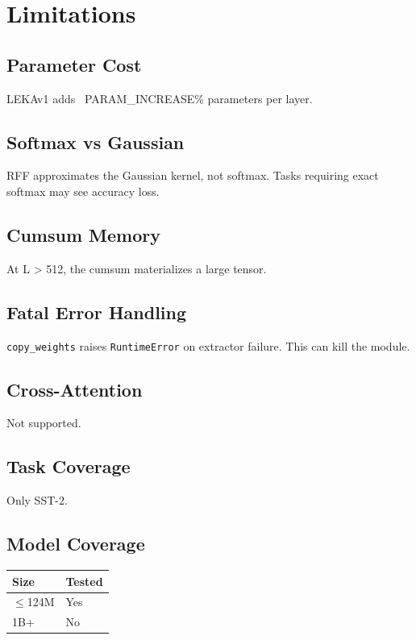 \section{Limitations}

\subsection{Parameter Cost}

LEKAv1 adds ~{{PARAM\_INCREASE}}\% parameters per layer.

\subsection{Softmax vs Gaussian}

RFF approximates the Gaussian kernel, not softmax. Tasks requiring exact 
softmax may see accuracy loss.

\subsection{Cumsum Memory}

At L > 512, the cumsum materializes a large tensor.

\subsection{Fatal Error Handling}

\texttt{copy\_weights} raises \texttt{RuntimeError} on extractor failure. This can kill 
the module.

\subsection{Cross-Attention}

Not supported.

\subsection{Task Coverage}

Only SST-2.

\subsection{Model Coverage}

\begin{table}[H]
\centering
\small
\begin{tabular}{ll}
\toprule
\textbf{Size} & \textbf{Tested} \\
\midrule
$\le$124M & Yes \\
1B+ & No \\
\bottomrule
\end{tabular}
\end{table}

